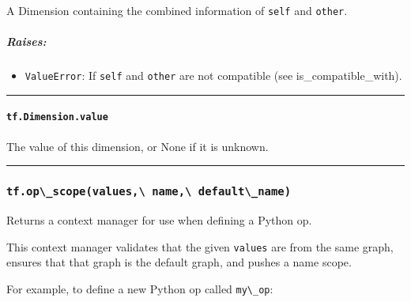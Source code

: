 A Dimension containing the combined information of \lstinline{self} and
\lstinline{other}.

\subparagraph{Raises: }\label{raises-26}

\begin{itemize}
\tightlist
\item
  \lstinline{ValueError}: If \lstinline{self} and \lstinline{other} are not
  compatible (see is\_compatible\_with).
\end{itemize}

\begin{center}\rule{0.5\linewidth}{\linethickness}\end{center}

\paragraph{\texorpdfstring{\lstinline{tf.Dimension.value}
}{tf.Dimension.value }}\label{tf.dimension.value}

The value of this dimension, or None if it is unknown.

\begin{center}\rule{0.5\linewidth}{\linethickness}\end{center}

\subsubsection{\texorpdfstring{\lstinline{tf.op\_scope(values,\ name,\ default\_name)}
}{tf.op\_scope(values, name, default\_name) }}\label{tf.opux5fscopevalues-name-defaultux5fname}

Returns a context manager for use when defining a Python op.

This context manager validates that the given \lstinline{values} are from
the same graph, ensures that that graph is the default graph, and pushes
a name scope.

For example, to define a new Python op called \lstinline{my\_op}:

\begin{Shaded}
\begin{Highlighting}[]
 \OperatorTok{=}\NormalTok{):}
   \NormalTok{) } 
    \OperatorTok{=} \OperatorTok{=}\NormalTok{)}
    \OperatorTok{=} \OperatorTok{=}\NormalTok{)}
    \OperatorTok{=} \OperatorTok{=}\NormalTok{)}
     \OperatorTok{=}
\end{Highlighting}
\end{Shaded}

